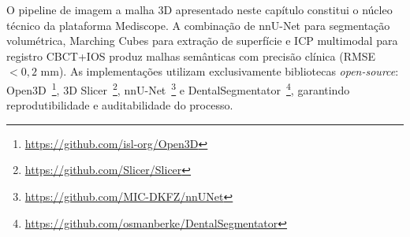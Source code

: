 O pipeline de imagem a malha 3D apresentado neste capítulo constitui o núcleo técnico da plataforma Mediscope. A combinação de nnU-Net para segmentação volumétrica, Marching Cubes para extração de superfície e ICP multimodal para registro CBCT+IOS produz malhas semânticas com precisão clínica (RMSE $< 0,2$ mm). As implementações utilizam exclusivamente bibliotecas \textit{open-source}: Open3D~\footnote{\url{https://github.com/isl-org/Open3D}}, 3D Slicer~\footnote{\url{https://github.com/Slicer/Slicer}}, nnU-Net~\footnote{\url{https://github.com/MIC-DKFZ/nnUNet}} e DentalSegmentator~\footnote{\url{https://github.com/osmanberke/DentalSegmentator}}, garantindo reprodutibilidade e auditabilidade do processo.
\endinput
